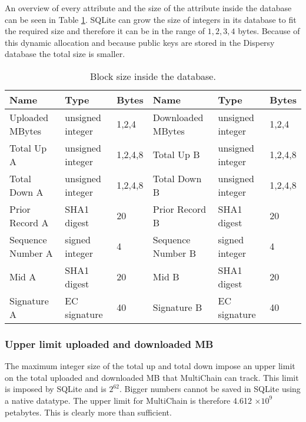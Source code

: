An overview of every attribute and the size of the attribute inside the database can be seen in Table \ref{table:block_size_persistence}.
SQLite can grow the size of integers in its database to fit the required size
and therefore it can be in the range of $1,2,3,4$ bytes.
Because of this dynamic allocation and because public keys are stored in the Dispersy database
the total size is smaller.

\begin{table}[]
\begin{adjustwidth}{-.5in}{-.5in}
\begin{center}
\begin{tabular}{lll||lll}
Name              & Type             & Bytes                  & Name              & Type             & Bytes    \\ \hline
Uploaded MBytes   & unsigned integer & 1,2,4                  & Downloaded MBytes & unsigned integer & 1,2,4    \\
Total Up A        & unsigned integer & 1,2,4,8                & Total Up B        & unsigned integer & 1,2,4,8  \\
Total Down A      & unsigned integer & 1,2,4,8                & Total Down B      & unsigned integer & 1,2,4,8  \\
Prior Record A    & SHA1 digest      & 20                     & Prior Record B    & SHA1 digest      & 20       \\
Sequence Number A & signed integer   & 4                      & Sequence Number B & signed integer   & 4        \\
Mid A             & SHA1 digest      & 20                     & Mid B             & SHA1 digest      & 20       \\
Signature A       & EC signature     & 40                     & Signature B       & EC signature     & 40
\end{tabular}
\caption{Block size inside the database.}
\label{table:block_size_persistence}
\end{center}
\end{adjustwidth}
\end{table}

\subsubsection{Upper limit uploaded and downloaded MB}
The maximum integer size of the total up and total down impose an upper limit
on the total uploaded and downloaded MB that MultiChain can track.
This limit is imposed by SQLite and is $2^{62}$.
Bigger numbers cannot be saved in SQLite using a native datatype.
The upper limit for MultiChain is therefore 4.612 \ensuremath{\times 10^{9}} petabytes.
This is clearly more than sufficient.